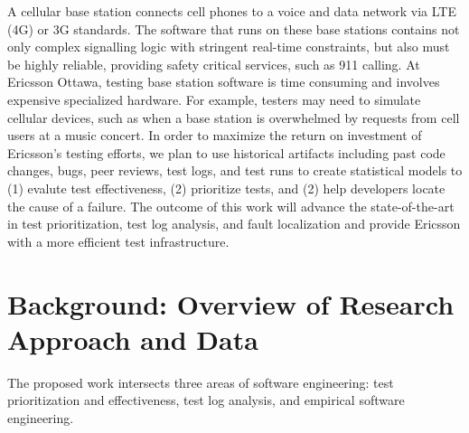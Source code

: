 A cellular base station connects cell phones to a voice and data network via
LTE (4G) or 3G standards. The software that runs on these base stations
contains not only complex signalling logic with stringent real-time
constraints, but also must be highly reliable, providing safety critical
services, such as 911 calling. At Ericsson Ottawa, testing base station
software is time consuming and involves expensive specialized hardware. For
example, testers may need to simulate cellular devices, such as when a base
station is overwhelmed by requests from cell users at a music concert. In
order to maximize the return on investment of Ericsson's testing efforts, we
plan to use historical artifacts including past code changes, bugs, peer
reviews, test logs, and test runs to create statistical models to (1) evalute
test effectiveness, (2) prioritize tests, and (2) help developers locate the
cause of a failure. The outcome of this work will advance the state-of-the-art
in test prioritization, test log analysis, and fault localization and provide
Ericsson with a more efficient test infrastructure.

\section*{Background: Overview of Research Approach and Data}

The proposed work intersects three areas of software engineering: test
prioritization and effectiveness, test log analysis, and empirical software engineering. 

